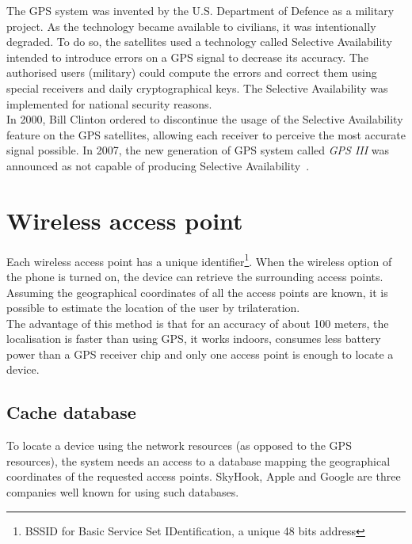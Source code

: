 The GPS system was invented by the U.S. Department of Defence as a military project.
As the technology became available to civilians, it was intentionally degraded.
To do so, the satellites used a technology called Selective Availability intended to introduce errors on a GPS signal to decrease its accuracy.
The authorised users (military) could compute the errors and correct them using special receivers and daily cryptographical keys.
The Selective Availability was implemented for national security reasons.\\

In 2000, Bill Clinton ordered to discontinue the usage of the Selective Availability feature on the GPS satellites, allowing each receiver to perceive the most accurate signal possible. In 2007, the new generation of GPS system called \emph{GPS III} was announced as not capable of producing Selective Availability~\cite{gps-sa}.\\

\section{Wireless access point}
\label{sec:andro-wifi}
Each wireless access point has a unique identifier\footnote{BSSID for Basic Service Set IDentification, a unique 48 bits address}.
When the wireless option of the phone is turned on, the device can retrieve the surrounding access points.
Assuming the geographical coordinates of all the access points are known, it is possible to estimate the location of the user by trilateration.\\

The advantage of this method is that for an accuracy of about 100 meters, the localisation is faster than using GPS, it works indoors, consumes less battery power than a GPS receiver chip and only one access point is enough to locate a device.\\

\subsection{Cache database}
\label{sec:andro-cell-db}

To locate a device using the network resources (as opposed to the GPS resources), the system needs an access to a database mapping the geographical coordinates of the requested access points.
SkyHook, Apple and Google are three companies well known for using such databases.\\

